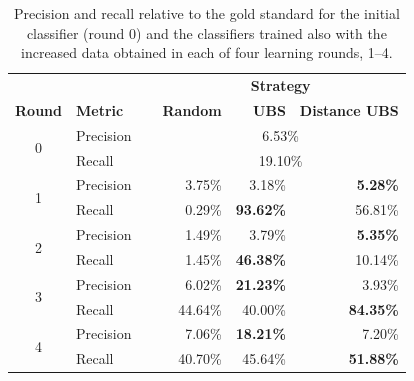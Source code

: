 \begin{table}[ht!]
\centering
\caption{Precision and recall relative to the gold standard for
the initial classifier (round 0) and the classifiers trained also with the increased data obtained in each of
four learning rounds, 1--4.\label{tab:pr_table}
}
\vspace{2ex}
\setlength\tabcolsep{6pt}
\begin{tabular}{|c| l | r | r | r |}
\hline
& & \multicolumn{3}{c|}{\textbf{Strategy}} \\
 \textbf{Round} & \textbf{Metric} & \textbf{Random} & \textbf{UBS}  & \textbf{Distance UBS}  \\
\hline
\multirow{2}{*}{0} & Precision &        \multicolumn{3}{c|}{6.53\%} \\
 & Recall\ \ \ \ \ &               \multicolumn{3}{c|}{19.10\%} \\
\hline
\multirow{2}{*}{1}  & Precision     & 3.75\%       &      3.18\%      &  \textbf{5.28\%} \\
 & Recall\ \ \ \ \ & 0.29\%      &   \textbf{93.62\%}     &  56.81\% \\
\hline
\multirow{2}{*}{2} & Precision      & 1.49\%           &      3.79\%      &  \textbf{5.35\%} \\
& Recall\ \ \ \ \ & 1.45\%           &    \textbf{46.38\%}      &  10.14\% \\
\hline
\multirow{2}{*}{3}  & Precision      & 6.02\%              &    \textbf{21.23\%}      &  3.93\% \\
 & Recall\ \ \ \ \ & 44.64\%            &    40.00\%      &  \textbf{84.35\%}  \\
\hline
\multirow{2}{*}{4} & Precision     & 7.06\%          &    \textbf{18.21\%}      &  7.20\% \\
& Recall\ \ \ \ \ & 40.70\%         &     45.64\%     &  \textbf{51.88\%} \\
\hline
\end{tabular}
\end{table}

